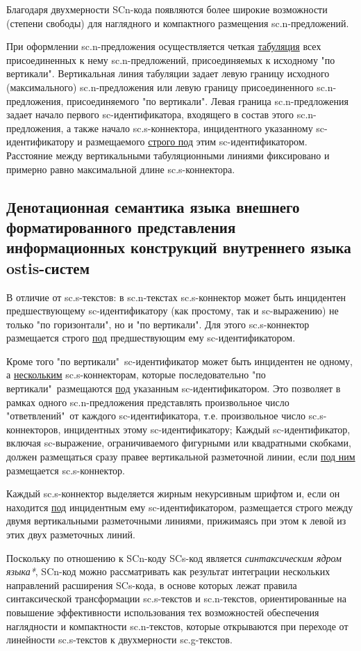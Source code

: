 Благодаря двухмерности SCn-кода появляются более широкие возможности (степени свободы) для наглядного и компактного размещения sc.n-предложений.

При оформлении sc.n-предложения осуществляется четкая \uline{табуляция} всех присоединенных к нему sc.n-предложений, присоединяемых к исходному "по вертикали". Вертикальная линия табуляции задает левую границу исходного (максимального) sc.n-предложения или левую границу присоединенного sc.n-предложения, присоединяемого "по вертикали". Левая граница sc.n-предложения задает начало первого sc-идентификатора, входящего в состав этого \mbox{sc.n-предложения}, а также начало sc.s-коннектора, инцидентного указанному \mbox{sc-идентификатору} и размещаемого \uline{строго под} этим sc-идентификатором. Расстояние между вертикальными табуляционными линиями фиксировано и примерно равно максимальной длине sc.s-коннектора.

\subsection{Денотационная семантика языка внешнего форматированного представления информационных конструкций внутреннего языка ostis-систем}


В отличие от sc.s-текстов: в sc.n-текстах sc.s-коннектор может быть инцидентен предшествующему sc-идентификатору (как простому, так и sc-выражению) не только "по горизонтали"{}, но и "по вертикали". Для этого sc.s-коннектор размещается строго \uline{под} предшествующим ему sc-идентификатором.

Кроме того "по вертикали"\ sc-идентификатор может быть инцидентен не одному, а \uline{нескольким} sc.s-коннекторам, которые последовательно "по вертикали"\ размещаются \uline{под} указанным sc-идентификатором. Это позволяет в рамках одного sc.n-предложения представлять произвольное число "ответвлений"\ от каждого sc-идентификатора, т.е. произвольное число sc.s-коннекторов, инцидентных этому sc-идентификатору;
Каждый sc-идентификатор, включая sc-выражение, ограничиваемого фигурными или квадратными скобками, должен размещаться сразу правее вертикальной разметочной линии, если \uline{под ним} размещается sc.s-коннектор.

Каждый sc.s-коннектор выделяется жирным некурсивным шрифтом и, если он находится \uline{под} инцидентным ему sc-идентификатором, размещается строго между двумя вертикальными разметочными линиями, прижимаясь при этом к левой из этих двух разметочных линий.

Поскольку по отношению к SCn-коду SCs-код является \textit{синтаксическим ядром языка*}, SCn-код можно рассматривать как результат интеграции нескольких направлений расширения SCs-кода, в основе которых лежат правила синтаксической трансформации sc.s-текстов и sc.n-текстов, ориентированные на повышение эффективности использования тех возможностей обеспечения наглядности и компактности sc.n-текстов, которые открываются при переходе от линейности sc.s-текстов к двухмерности sc.g-текстов.

%